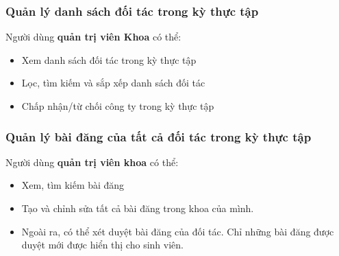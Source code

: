 \documentclass[./../main.tex]{subfiles}
\begin{document}
\hypertarget{quux1ea3n-luxfd-danh-suxe1ch-ux111ux1ed1i-tuxe1c-trong-kux1ef3-thux1ef1c-tux1eadp}{%
	\subsubsection{Quản lý danh sách đối tác trong kỳ thực
		tập}\label{quux1ea3n-luxfd-danh-suxe1ch-ux111ux1ed1i-tuxe1c-trong-kux1ef3-thux1ef1c-tux1eadp}}
  
Người dùng \textbf{quản trị viên Khoa} có thể:
  
\begin{itemize}
	\item
	      
	      	Xem danh sách đối tác trong kỳ thực tập
	      
	\item
	      
	      	Lọc, tìm kiếm và sắp xếp danh sách đối tác
	      
	\item
	      
	      	Chấp nhận/từ chối công ty trong kỳ thực tập
	      
\end{itemize}
  
\hypertarget{quux1ea3n-luxfd-buxe0i-ux111ux103ng-cux1ee7a-tux1ea5t-cux1ea3-ux111ux1ed1i-tuxe1c-trong-kux1ef3-thux1ef1c-tux1eadp}{%
	\subsubsection{Quản lý bài đăng của tất cả đối tác trong kỳ thực
		tập}\label{quux1ea3n-luxfd-buxe0i-ux111ux103ng-cux1ee7a-tux1ea5t-cux1ea3-ux111ux1ed1i-tuxe1c-trong-kux1ef3-thux1ef1c-tux1eadp}}
  
Người dùng \textbf{quản trị viên khoa} có thể:
  
\begin{itemize}
	\item
	      
	      	Xem, tìm kiếm bài đăng
	      
	\item
	      
	      	Tạo và chỉnh sửa tất cả bài đăng trong khoa của mình.
	      
	\item
	      
	      	Ngoài ra, có thể xét duyệt bài đăng của đối tác. Chỉ những bài đăng
	      	được duyệt mới được hiển thị cho sinh viên.
	      
\end{itemize}
  
\end{document}
